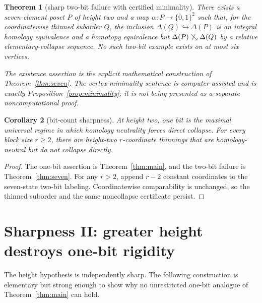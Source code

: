 \documentclass[11pt]{article}
\newtheorem{theorem}{Theorem}[section]
\newtheorem{corollary}[theorem]{Corollary}
\theoremstyle{definition}
\theoremstyle{remark}
\newcommand{\D}{\Delta}
\newcommand{\searrowrel}{\mathrel{\searrow}}
\begin{document}
\begin{theorem}[sharp two-bit failure with certified minimality]\label{thm:twobit-sharp}
There exists a seven-element poset $P$ of height two and a map
$\alpha:P\to\{0,1\}^2$ such that, for the coordinatewise thinned suborder $Q$,
the inclusion $\D(Q)\hookrightarrow\D(P)$ is an integral homology equivalence and a
homotopy equivalence but $\D(P)\not\searrowrel\D(Q)$ by a relative elementary-collapse
sequence.  No such two-bit example exists on at most six vertices.

The existence assertion is the explicit mathematical construction of
Theorem~\ref{thm:seven}.  The vertex-minimality sentence is computer-assisted and is
exactly Proposition~\ref{prop:minimality}; it is not being presented as a separate
noncomputational proof.
\end{theorem}

\begin{corollary}[bit-count sharpness]\label{cor:bitsharp}
At height two, one bit is the maximal universal regime in which homology neutrality
forces direct collapse.  For every block size $r\ge2$, there are height-two
$r$-coordinate thinnings that are homology-neutral but do not collapse directly.
\end{corollary}

\begin{proof}
The one-bit assertion is Theorem~\ref{thm:main}, and the two-bit failure is
Theorem~\ref{thm:seven}.  For any $r>2$, append $r-2$ constant coordinates to the
seven-state two-bit labeling.  Coordinatewise comparability is unchanged, so the
thinned suborder and the same noncollapse certificate persist.
\end{proof}

\section{Sharpness II: greater height destroys one-bit rigidity}\label{sec:height}

The height hypothesis is independently sharp.  The following construction is elementary
but strong enough to show why no unrestricted one-bit analogue of
Theorem~\ref{thm:main} can hold.
\end{document}
